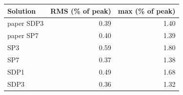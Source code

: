 \begin{tabular}{lrr}
\hline
Solution & RMS (\% of peak) & max (\% of peak) \\
\hline
paper SDP3 & 0.39 & 1.40 \\
paper SP7 & 0.40 & 1.39 \\
SP3 & 0.59 & 1.80 \\
SP7 & 0.37 & 1.38 \\
SDP1 & 0.49 & 1.68 \\
SDP3 & 0.36 & 1.32 \\
\hline
\end{tabular}
